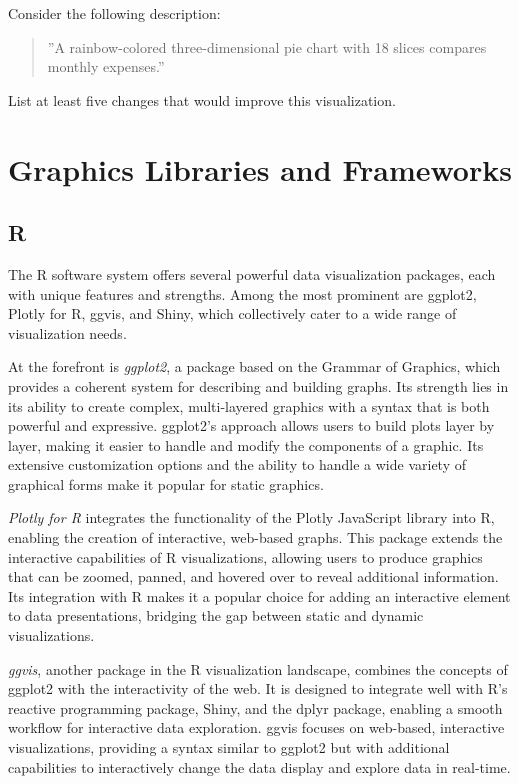 \begin{exerciseboxpaper}
Consider the following description:

\begin{quote}
''A rainbow-colored three-dimensional pie chart with 18 slices compares monthly expenses.''
\end{quote}

List at least five changes that would improve this visualization.
\end{exerciseboxpaper}


\FloatBarrier


\section{Graphics Libraries and Frameworks}

\subsection*{R}

The R software system offers several powerful data visualization packages, each with unique features and strengths. Among the most prominent are ggplot2, Plotly for R, ggvis, and Shiny, which collectively cater to a wide range of visualization needs.

At the forefront is \emph{ggplot2}, a package based on the Grammar of Graphics, which provides a coherent system for describing and building graphs. Its strength lies in its ability to create complex, multi-layered graphics with a syntax that is both powerful and expressive. ggplot2's approach allows users to build plots layer by layer, making it easier to handle and modify the components of a graphic. Its extensive customization options and the ability to handle a wide variety of graphical forms make it popular for static graphics.

\emph{Plotly for R} integrates the functionality of the Plotly JavaScript library into R, enabling the creation of interactive, web-based graphs. This package extends the interactive capabilities of R visualizations, allowing users to produce graphics that can be zoomed, panned, and hovered over to reveal additional information. Its integration with R makes it a popular choice for adding an interactive element to data presentations, bridging the gap between static and dynamic visualizations.

\emph{ggvis}, another package in the R visualization landscape, combines the concepts of ggplot2 with the interactivity of the web. It is designed to integrate well with R's reactive programming package, Shiny, and the dplyr package, enabling a smooth workflow for interactive data exploration. ggvis focuses on web-based, interactive visualizations, providing a syntax similar to ggplot2 but with additional capabilities to interactively change the data display and explore data in real-time.

